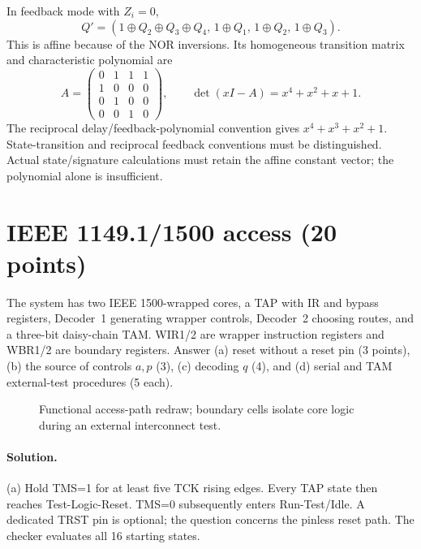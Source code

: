 \documentclass[11pt,a4paper]{article}
\newcommand{\sol}{\paragraph{Solution.}}
\begin{document}
In feedback mode with $Z_i=0$,
\[
 Q'=(1\oplus Q_2\oplus Q_3\oplus Q_4,\,
 1\oplus Q_1,\,1\oplus Q_2,\,1\oplus Q_3).
\]
This is affine because of the NOR inversions. Its homogeneous transition matrix and characteristic polynomial are
\[
 A=\begin{pmatrix}0&1&1&1\\1&0&0&0\\0&1&0&0\\0&0&1&0\end{pmatrix},
 \qquad\det(xI-A)=x^4+x^2+x+1.
\]
The reciprocal delay/feedback-polynomial convention gives $x^4+x^3+x^2+1$. State-transition and reciprocal feedback conventions must be distinguished. Actual state/signature calculations must retain the affine constant vector; the polynomial alone is insufficient.

\section{IEEE 1149.1/1500 access (20 points)}
The system has two IEEE 1500-wrapped cores, a TAP with IR and bypass registers, Decoder~1 generating wrapper controls, Decoder~2 choosing routes, and a three-bit daisy-chain TAM. WIR1/2 are wrapper instruction registers and WBR1/2 are boundary registers. Answer (a) reset without a reset pin (3 points), (b) the source of controls $a,p$ (3), (c) decoding $q$ (4), and (d) serial and TAM external-test procedures (5 each).

\begin{figure}[ht]\centering
{}
\caption{Functional access-path redraw; boundary cells isolate core logic during an external interconnect test.}
\end{figure}
\sol (a) Hold TMS=1 for at least five TCK rising edges. Every TAP state then reaches Test-Logic-Reset. TMS=0 subsequently enters Run-Test/Idle. A dedicated TRST pin is optional; the question concerns the pinless reset path. The checker evaluates all 16 starting states.
\end{document}
